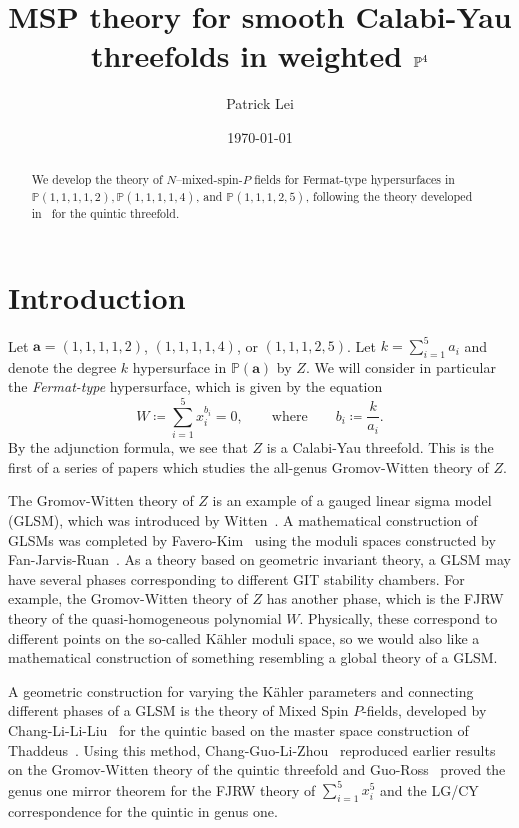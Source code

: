 \documentclass{amsart}
\title{MSP theory for smooth Calabi-Yau threefolds in weighted $\P^4$}
\author{Patrick Lei}
\date{\today}
\theoremstyle{definition}
\theoremstyle{remark}
\theoremstyle{plain}
\theoremstyle{definition}
\theoremstyle{remark}
\renewcommand{\P}{\mathbb{P}}
\newcommand{\ba}{\mathbf{a}}
\newcommand{\1}{\mathbf{1}}
\newcommand{\2}{\mathbf{2}}
\newcommand{\3}{\mathbf{3}}
\begin{document}
    
\begin{abstract}
  We develop the theory of $N$--mixed-spin-$P$ fields for Fermat-type hypersurfaces in $\P(1,1,1,1,2), \P(1,1,1,1,4)$, and $\P(1,1,1,2,5)$, following the theory developed in~\cite{nmsp} for the quintic threefold.
\end{abstract}

\maketitle

\tableofcontents

\section{Introduction}
\label{sec:introduction}

Let $\ba = (1,1,1,1,2)$, $(1,1,1,1,4)$, or $(1,1,1,2,5)$. Let $k = \sum_{i=1}^5 a_i$ and denote the degree $k$ hypersurface in $\P(\ba)$ by $Z$. We will consider in particular the \textit{Fermat-type} hypersurface, which is given by the equation
\[ W \coloneqq \sum_{i=1}^{5} x_i^{b_i} = 0, \qquad \text{where} \qquad b_i \coloneqq \frac{k}{a_i}. \]
By the adjunction formula, we see that $Z$ is a Calabi-Yau threefold. This is the first of a series of papers which studies the all-genus Gromov-Witten theory of $Z$.

The Gromov-Witten theory of $Z$ is an example of a gauged linear sigma model (GLSM), which was introduced by Witten~\cite{mirrorandglsm}. A mathematical construction of GLSMs was completed by Favero-Kim~\cite{faverokim} using the moduli spaces constructed by Fan-Jarvis-Ruan~\cite{glsm}. As a theory based on geometric invariant theory, a GLSM may have several phases corresponding to different GIT stability chambers. For example, the Gromov-Witten theory of $Z$ has another phase, which is the FJRW theory of the quasi-homogeneous polynomial $W$.
Physically, these correspond to different points on the so-called K\"ahler moduli space, so we would also like a mathematical construction of something resembling a global theory of a GLSM.

A geometric construction for varying the K\"ahler parameters and connecting different phases of a GLSM is the theory of Mixed Spin $P$-fields, developed by Chang-Li-Li-Liu~\cite{mspfermat, msp2} for the quintic based on the master space construction of Thaddeus~\cite{gitflips}. Using this method, Chang-Guo-Li-Zhou~\cite{genusonemsp} reproduced earlier results on the Gromov-Witten theory of the quintic threefold and Guo-Ross~\cite{g1mslg,g1lgcy} proved the genus one mirror theorem for the FJRW theory of $\sum_{i=1}^5 x_i^5$ and the LG/CY correspondence for the quintic in genus one.
\end{document}
